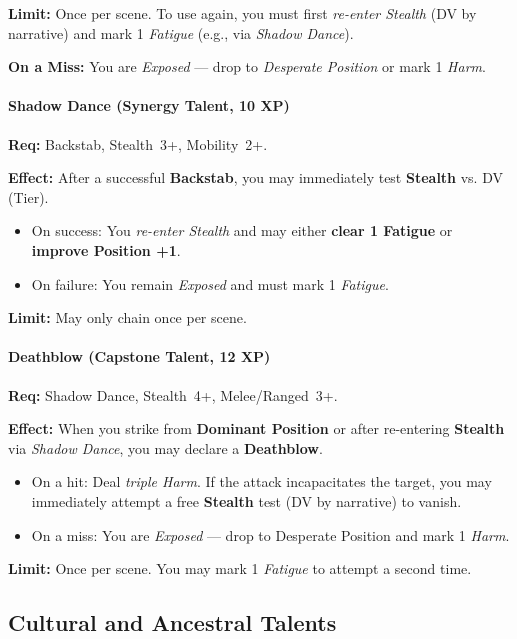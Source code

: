 \textbf{Limit:} Once per scene. To use again, you must first \emph{re-enter Stealth} (DV by narrative) and mark 1 \emph{Fatigue} (e.g., via \emph{Shadow Dance}).  

\textbf{On a Miss:} You are \emph{Exposed} --- drop to \emph{Desperate Position} or mark 1 \emph{Harm}.    

\paragraph{Shadow Dance (Synergy Talent, 10 XP)}  
\textbf{Req:} Backstab, Stealth~3+, Mobility~2+.  

\textbf{Effect:} After a successful \textbf{Backstab}, you may immediately test \textbf{Stealth} vs. DV (Tier).  
\begin{itemize}
  \item On success: You \emph{re-enter Stealth} and may either \textbf{clear 1 Fatigue} or \textbf{improve Position +1}.  
  \item On failure: You remain \emph{Exposed} and must mark 1 \emph{Fatigue}.  
\end{itemize}  

\textbf{Limit:} May only chain once per scene.   

\paragraph{Deathblow (Capstone Talent, 12 XP)}  
\textbf{Req:} Shadow Dance, Stealth~4+, Melee/Ranged~3+.  

\textbf{Effect:} When you strike from \textbf{Dominant Position} or after re-entering \textbf{Stealth} via \emph{Shadow Dance}, you may declare a \textbf{Deathblow}.  
\begin{itemize}
  \item On a hit: Deal \emph{triple Harm}. If the attack incapacitates the target, you may immediately attempt a free \textbf{Stealth} test (DV by narrative) to vanish.  
  \item On a miss: You are \emph{Exposed} — drop to Desperate Position and mark 1 \emph{Harm}.  
\end{itemize}  

\textbf{Limit:} Once per scene. You may mark 1 \emph{Fatigue} to attempt a second time.  

\subsection{Cultural and Ancestral Talents}
\label{subsec:cultural-talents}

